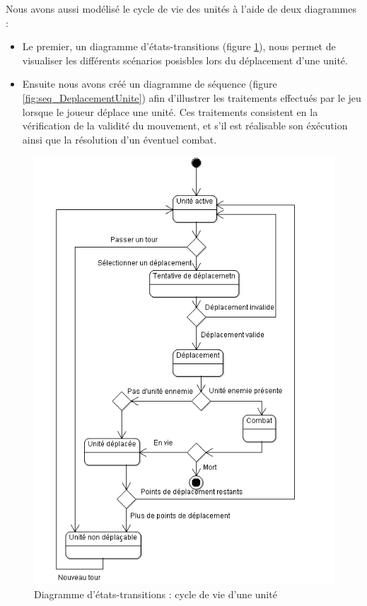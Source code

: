 Nous avons aussi modélisé le cycle de vie des unités à l'aide de deux diagrammes :
\begin{itemize}
  \item Le premier, un diagramme d'états-transitions (figure \ref{fig:CycleVieUnite}), nous permet de visualiser les différents scénarios posisbles lors du déplacement d'une unité.
  \item Ensuite nous avons créé un diagramme de séquence (figure \ref{fig:seq_DeplacementUnite}) afin d'illustrer les traitements effectués par le jeu lorsque le joueur déplace une unité. Ces traitements consistent en la vérification de la validité du mouvement, et s'il est réalisable son éxécution ainsi que la résolution d'un éventuel combat.
\end{itemize}

\begin{figure}[!h]
\centering
\includegraphics[width=.7\textwidth]{Parties/Images/CycleVieUnite.png}
\caption{Diagramme d'états-transitions : cycle de vie d'une unité}
\label{fig:CycleVieUnite}
\end{figure}

